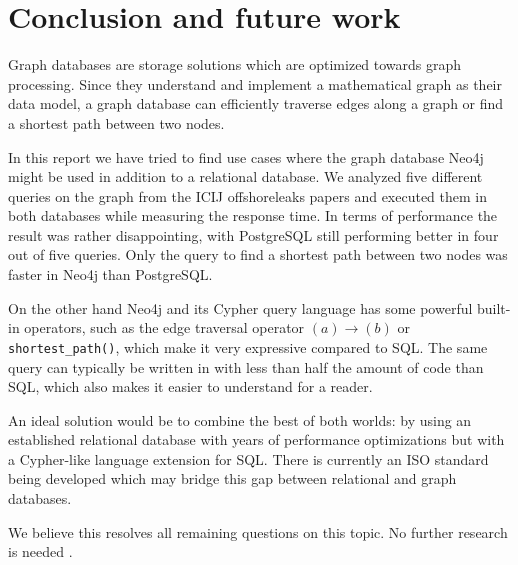 \documentclass[11pt, a4paper,oneside,chapterprefix=false]{scrbook}
\begin{document}
\chapter{Conclusion and future work} \label{chp:conclusion}

Graph databases are storage solutions which are optimized towards graph processing.
Since they understand and implement a mathematical graph as their data model, a graph database can efficiently traverse edges along a graph or find a shortest path between two nodes.

In this report we have tried to find use cases where the graph database Neo4j might be used in addition to a relational database.
We analyzed five different queries on the graph from the ICIJ offshoreleaks papers and executed them in both databases while measuring the response time.
In terms of performance the result was rather disappointing, with PostgreSQL still performing better in four out of five queries.
Only the query to find a shortest path between two nodes was faster in Neo4j than PostgreSQL.

On the other hand Neo4j and its Cypher query language has some powerful built-in operators, such as the edge traversal operator $(a) \rightarrow (b)$ or \lstinline{shortest_path()}, which make it very expressive compared to SQL.
The same query can typically be written in with less than half the amount of code than SQL, which also makes it easier to understand for a reader.

An ideal solution would be to combine the best of both worlds: by using an established relational database with years of performance optimizations but with a Cypher-like language extension for SQL.
There is currently an ISO standard being developed \cite{sqlpgd} which may bridge this gap between relational and graph databases.

We believe this resolves all remaining questions on this topic. No further research is needed \cite{xkcdresearch}.



\end{document}
